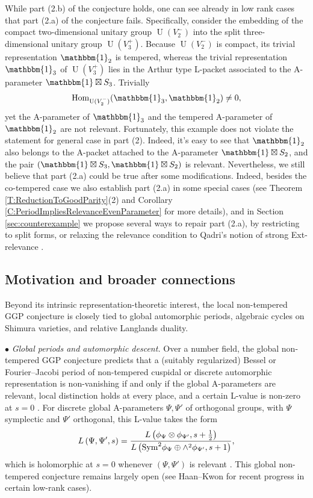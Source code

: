 \documentclass[11pt,letterpaper]{amsart}
\theoremstyle{plain}
\numberwithin{theorem}{section}
\numberwithin{equation}{subsection}
\theoremstyle{remark}
\newcommand{\Hom}{\operatorname{Hom}}
\newcommand{\U}{\operatorname{U}}
\begin{document}
While part (2.b) of the conjecture holds, one can see already in low rank cases that part (2.a) of the conjecture fails. Specifically, consider the embedding of the compact two-dimensional unitary group $\U(V_2^-)$ into the split three-dimensional unitary group $\U(V_3^+)$. Because $\U(V_2^-)$ is compact, its trivial representation $\mathbbm{1}_2$ is tempered, whereas the trivial representation $\mathbbm{1}_3$ of $\U(V_3^+)$ lies in the Arthur type L-packet associated to the A-parameter $\mathbbm{1} \boxtimes S_3$. Trivially
\[
    \Hom_{\U(V_2^-)}(\mathbbm{1}_3, \mathbbm{1}_2) \neq 0,
\]
yet the A-parameter of $\mathbbm{1}_3$ and the tempered A-parameter of $\mathbbm{1}_2$ are not relevant. Fortunately, this example does not violate the statement for general case in part (2). Indeed, it's easy to see that $\mathbbm{1}_2$ also belongs to the A-packet attached to the A-parameter $\mathbbm{1} \boxtimes S_2$, and the pair $\left(\mathbbm{1} \boxtimes S_3,\mathbbm{1} \boxtimes S_2\right)$ is relevant. Nevertheless, we still believe that part (2.a) could be true after some modifications. Indeed, besides the co-tempered case we also establish part (2.a) in some special cases (see Theorem \ref{T:ReductionToGoodParity}(2) and Corollary \ref{C:PeriodImpliesRelevanceEvenParameter} for more details), and in Section \ref{sec:counterexample} we propose several ways to repair part (2.a), by restricting to split forms, or relaxing the relevance condition to Qadri's notion of strong Ext-relevance \cite{MR4846726, cq26}.

\subsection{Motivation and broader connections}

Beyond its intrinsic representation-theoretic interest, the local non-tempered GGP conjecture is closely tied to global automorphic periods, algebraic cycles on Shimura varieties, and relative Langlands duality.

\vskip 5pt

$\bullet$ \textit{Global periods and automorphic descent.}
Over a number field, the global non-tempered GGP conjecture predicts that a (suitably regularized) Bessel or Fourier--Jacobi period of non-tempered cuspidal or discrete automorphic representation is non-vanishing if and only if the global A-parameters are relevant, local distinction holds at every place, and a certain L-value is non-zero at $s=0$ \cite[Conj. 9.1]{MR4190046}. For discrete global A-parameters $\Psi, \Psi'$ of orthogonal groups, with $\Psi$ symplectic and $\Psi'$ orthogonal, this L-value takes the form
\[
    L\left(\Psi,\Psi',s\right) = \frac{L\left(\phi_\Psi \otimes \phi_{\Psi'},s+\frac{1}{2}\right)}{L\left({\rm Sym}^2\phi_\Psi\oplus\wedge^2\phi_{\Psi'},s+1\right)},
\]
which is holomorphic at $s=0$ whenever $\left(\Psi, \Psi'\right)$ is relevant \cite[Thm. 9.7]{MR4190046}. This global non-tempered conjecture remains largely open (see Haan--Kwon \cite{HK26} for recent progress in certain low-rank cases). 
\end{document}
